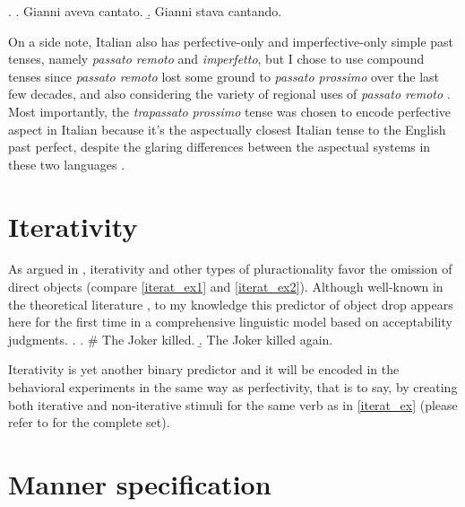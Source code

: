 \ex.\label{perf_ex_ita} \a. Gianni aveva cantato. \label{perf_ex1_ita} 
\b. Gianni stava cantando. \label{perf_ex2_ita}

On a side note, Italian also has perfective-only and imperfective-only simple past tenses, namely \textit{passato remoto} and \textit{imperfetto}, but I chose to use compound tenses since \textit{passato remoto} lost some ground to \textit{passato prossimo} over the last few decades, and also considering the variety of regional uses of \textit{passato remoto} \parencite{bertinetto1996distribuzione}. Most importantly, the \textit{trapassato} \textit{prossimo} tense was chosen to encode perfective aspect in Italian because it's the aspectually closest Italian tense to the English past perfect, despite the glaring differences between the aspectual systems in these two languages \parencite{bertinetto1992piucheperf}.


\section{Iterativity} 

As argued in , iterativity and other types of pluractionality favor the omission of direct objects (compare \ref{iterat_ex1} and \ref{iterat_ex2}). Although well-known in the theoretical literature \parencite{Glass2013, Glass2020, Ruda2017}, to my knowledge this predictor of object drop appears here for the first time in a comprehensive linguistic model based on acceptability judgments.
\ex.\label{iterat_ex} \a. \# The Joker killed. \label{iterat_ex1} 
\b. The Joker killed again. \label{iterat_ex2}

Iterativity is yet another binary predictor and it will be encoded in the behavioral experiments in the same way as perfectivity, that is to say, by creating both iterative and non-iterative stimuli for the same verb as in \ref{iterat_ex} (please refer to  for the complete set).


\section{Manner specification} 

